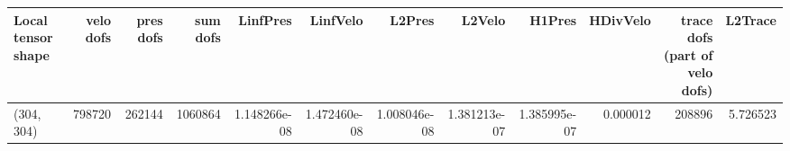 \begin{tabular}{lrrrrrrrrrrr}
\toprule
Local tensor shape &  velo dofs &  pres dofs &  sum dofs &     LinfPres &     LinfVelo &       L2Pres &       L2Velo &       H1Pres &  HDivVelo &  trace dofs (part of velo dofs) &  L2Trace \\
\midrule
        (304, 304) &     798720 &     262144 &   1060864 & 1.148266e-08 & 1.472460e-08 & 1.008046e-08 & 1.381213e-07 & 1.385995e-07 &  0.000012 &                          208896 & 5.726523 \\
\bottomrule
\end{tabular}
